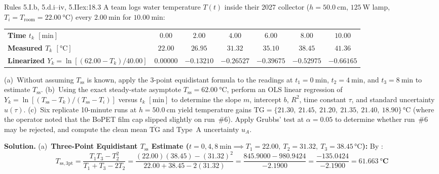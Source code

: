 \begin{workedexample}{Rules 5.I.b, 5.d.i--iv, 5.II}{ex:18.3}
A team logs water temperature $T(t)$ inside their 2027 collector ($h = \SI{50.0}{\centi\meter}$, $\SI{125}{\watt}$ lamp, $T_i = T_{\mathrm{room}} = \SI{22.00}{\celsius}$) every $\SI{2.00}{\minute}$ for $\SI{10.00}{\minute}$:
\begin{center}
\footnotesize
\setlength{\tabcolsep}{6pt}
\begin{tabular}{@{}lcccccc@{}}
\toprule
\textbf{Time $t_k$ $[\si{\minute}]$} & $0.00$ & $2.00$ & $4.00$ & $6.00$ & $8.00$ & $10.00$ \\
\textbf{Measured $T_k$ $[\si{\celsius}]$} & $22.00$ & $26.95$ & $31.32$ & $35.10$ & $38.45$ & $41.36$ \\
\textbf{Linearized $Y_k = \ln[(62.00 - T_k)/40.00]$} & $0.00000$ & $-0.13210$ & $-0.26527$ & $-0.39675$ & $-0.52975$ & $-0.66165$ \\
\bottomrule
\end{tabular}
\end{center}
(a)~Without assuming $T_{\mathrm{ss}}$ is known, apply the 3-point equidistant formula  to the readings at $t_1 = \SI{0}{\minute}$, $t_2 = \SI{4}{\minute}$, and $t_3 = \SI{8}{\minute}$ to estimate $T_{\mathrm{ss}}$.
(b)~Using the exact steady-state asymptote $T_{\mathrm{ss}} = \SI{62.00}{\celsius}$, perform an OLS linear regression  of $Y_k = \ln[(T_{\mathrm{ss}} - T_k)/(T_{\mathrm{ss}} - T_i)]$ versus $t_k$ $[\si{\minute}]$ to determine the slope $m$, intercept $b$, $R^2$, time constant $\tau$, and standard uncertainty $u(\tau)$.
(c)~Six replicate 10-minute runs at $h = \SI{50.0}{\centi\meter}$ yield temperature gains $\mathrm{TG} = \{21.30,\ 21.45,\ 21.20,\ 21.35,\ 21.40,\ 18.90\}\,\si{\celsius}$ (where the operator noted that the BoPET film cap slipped slightly on run~\#6). Apply Grubbs' test at $\alpha = 0.05$ to determine whether run~\#6 may be rejected, and compute the clean mean $\overline{\mathrm{TG}}$ and Type~A uncertainty $u_A$.
\par\smallskip\noindent
\textbf{Solution.}
(a)~\textbf{Three-Point Equidistant $T_{\mathrm{ss}}$ Estimate ($t = 0, 4, \SI{8}{\minute} \implies T_1 = 22.00,\ T_2 = 31.32,\ T_3 = 38.45\,\si{\celsius}$):}
By :
$$T_{\mathrm{ss,3pt}} = \frac{T_1 T_3 - T_2^2}{T_1 + T_3 - 2 T_2} = \frac{(22.00)(38.45) - (31.32)^2}{22.00 + 38.45 - 2(31.32)} = \frac{845.9000 - 980.9424}{-2.1900} = \frac{-135.0424}{-2.1900} = \mathbf{\SI{61.663}{\celsius}}$$

\end{workedexample}
